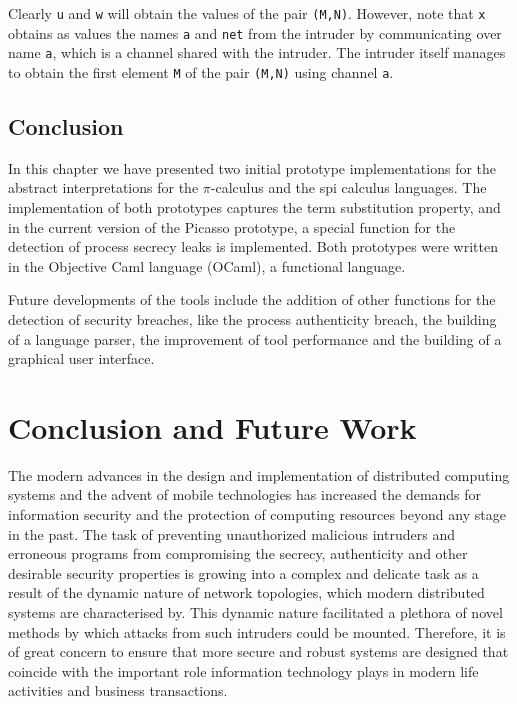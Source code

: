 \documentclass[10pt,a4paper,final,oneside,fleqn]{book}
\begin{document}
\noindent
Clearly \texttt{u} and \texttt{w} will obtain the values of the pair \texttt{(M,N)}.  However, note that \texttt{x} obtains as values the names \texttt{a} and \texttt{net} from the intruder by communicating over name \texttt{a}, which is a channel shared with the intruder. The intruder itself manages to obtain the first element \texttt{M} of the pair \texttt{(M,N)} using channel \texttt{a}.
\section{Conclusion}
In this chapter we have presented two initial prototype implementations for the abstract interpretations for the $\pi$-calculus and the spi calculus languages. The implementation of both prototypes captures the term substitution property, and in the current version of the Picasso prototype, a special function for the detection of process secrecy leaks is implemented. Both prototypes were written in the Objective Caml language (OCaml), a functional language.

Future developments of the tools include the addition of other functions for the detection of security breaches, like the process authenticity breach, the building of a language parser, the improvement of tool performance and the building of a graphical user interface.
\clearpage
\chapter{Conclusion and Future Work}
The modern advances in the design and implementation of distributed computing systems and the advent of mobile technologies has increased the demands for information security and the protection of computing resources beyond any stage in the past.  The task of preventing unauthorized malicious intruders and erroneous programs from compromising the secrecy, authenticity and other desirable security properties is growing into a complex and delicate task as a result of the dynamic nature of network topologies, which modern distributed systems are characterised by.  This dynamic nature facilitated a plethora of novel methods by which attacks from such intruders could be mounted.  Therefore, it is of great concern to ensure that more secure and robust systems are designed that coincide with the important role information technology plays in modern life activities and business transactions.
\end{document}
